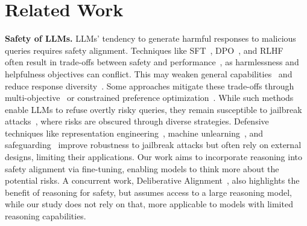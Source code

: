 \section{Related Work}

\textbf{Safety of LLMs.} LLMs’ tendency to generate harmful responses to malicious queries requires safety alignment. Techniques like SFT~\cite{liu2023makes,alpaca}, DPO~\cite{rafailov2024direct,liu2024enhancing}, and RLHF~\cite{ouyang2022training,bai2022training} often result in trade-offs between safety and performance~\cite{anwar2024foundational}, as harmlessness and helpfulness objectives can conflict. This may weaken general capabilities~\cite{lin2024mitigating} and reduce response diversity~\cite{kirkunderstanding}. Some approaches mitigate these trade-offs through multi-objective~\cite{zhou2024beyond,guo2024controllable} or constrained preference optimization~\cite{daisafe,wachi2024stepwise}.  While such methods enable LLMs to refuse overtly risky queries, they remain susceptible to jailbreak attacks~\cite{zou2023universal,liuautodan, souly2024strongreject}, where risks are obscured through diverse strategies. Defensive techniques like representation engineering~\cite{zou2024improving}, machine unlearning~\cite{liu2024rethinking}, and safeguarding~\cite{ji2024aligner,wang2024self} improve robustness to jailbreak attacks but often rely on external designs, limiting their applications. Our work aims to incorporate reasoning into safety alignment via fine-tuning, enabling models to think more about the potential risks. A concurrent work, Deliberative Alignment~\cite{guan2024deliberative}, also highlights the benefit of reasoning for safety, but assumes access to a large reasoning model, while our study does not rely on that, more applicable to models with limited reasoning capabilities.


